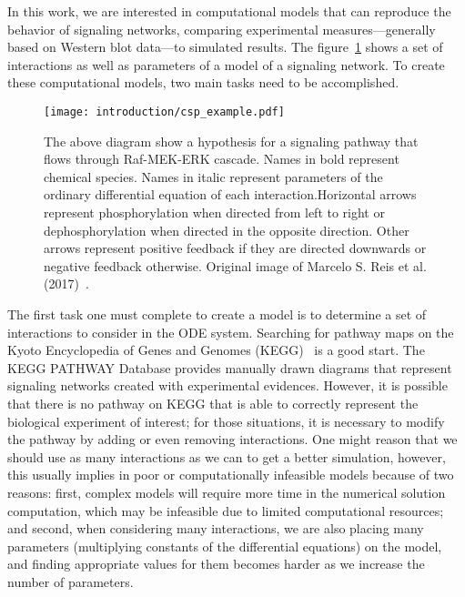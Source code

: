 In this work, we are interested in computational models that can 
reproduce the behavior of signaling networks, comparing experimental 
measures---generally based on Western blot data---to simulated results.
The figure~\ref{fig:signal_pathway_example} shows a set of interactions
as well as parameters of a model of a signaling network. To create these 
computational models, two main tasks need to be accomplished.

\begin{figure}[!ht]
\centering 
    \texttt{[image: introduction/csp\_example.pdf]}
\caption{The above diagram show a hypothesis for a signaling pathway 
    that flows through Raf-MEK-ERK cascade. Names in bold represent 
    chemical species. Names in italic represent parameters of the 
    ordinary differential equation of each interaction.Horizontal arrows
    represent phosphorylation when directed from left to right or 
    dephosphorylation when directed in the opposite direction. Other 
    arrows represent positive feedback if they are directed downwards or 
    negative feedback otherwise. Original image of Marcelo S. Reis et
    al. (2017)~\cite{Reis2017}.}
\label{fig:signal_pathway_example}
\end{figure}

The first task one must complete to create a model is to determine a set 
of interactions to consider in the ODE system. Searching for pathway 
maps on the Kyoto Encyclopedia of Genes and Genomes 
(KEGG)~\cite{Kanehisa2000kegg} is a good start. The KEGG PATHWAY 
Database provides manually drawn diagrams that represent signaling 
networks created with experimental evidences. However, it is possible 
that there is no pathway on KEGG that is able to correctly represent the 
biological experiment of interest; for those situations, it is necessary 
to modify the pathway by adding or even removing interactions. One might 
reason that we should use as many interactions as we can to get a better 
simulation, however, this usually implies in poor or computationally 
infeasible models because of two reasons: first, complex models will 
require more time in the numerical solution computation, which may be 
infeasible due to limited computational resources; and second, when 
considering many interactions, we are also placing many parameters 
(multiplying constants of the differential equations) on the model, and 
finding appropriate values for them becomes harder as we increase the 
number of parameters.

